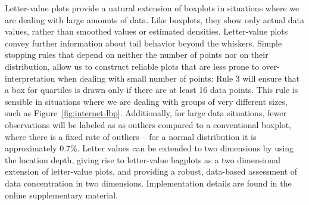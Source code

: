 \documentclass[12pt,oneside]{article}
\begin{document}
Letter-value plots provide a natural extension of boxplots in situations where we are dealing with large amounts of data. Like boxplots, they show only actual data values, rather than smoothed values or estimated densities. Letter-value plots convey further information about tail behavior beyond the whiskers. Simple stopping rules that depend on neither the number of points nor on their distribution, allow us to construct reliable plots that are less prone to over-interpretation when dealing with small number of points: Rule 3 will ensure that a box for quartiles is drawn only if there are at least 16 data points. This rule is sensible in situations where we are dealing with groups of very different sizes, such as Figure~\ref{fig:internet-lbp}. Additionally, for large data situations, fewer observations will be labeled as as outliers compared to a conventional boxplot, where there is a fixed rate of outliers -- for a normal distribution it is approximately 0.7\%. Letter values can be extended to two dimensions by using the location depth, giving rise to letter-value bagplots as a two dimensional extension of letter-value plots, and providing a robust, data-based assessment of data concentration in two dimensions. Implementation details are found in the online supplementary material.



%
\end{document}
